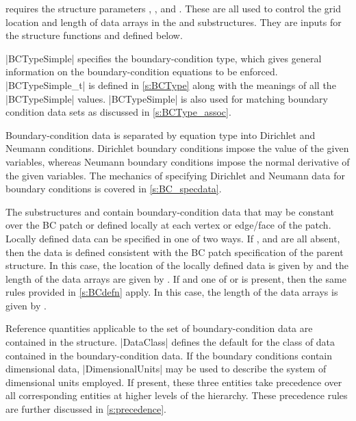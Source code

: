  requires the structure parameters ,
,  and
.  These are all used to control the grid location
and length of data arrays in the  and 
substructures.  They are inputs for the structure functions 
and  defined below.

|BCTypeSimple| specifies the boundary-condition type, which gives general
information on the bound\-ary-con\-di\-tion equations to be enforced.
|BCTypeSimple_t| is defined in \autoref{s:BCType} along with the meanings
of all the |BCTypeSimple| values.  
|BCTypeSimple| is also used for matching boundary condition data sets as 
discussed in \autoref{s:BCType_assoc}.

Boundary-condition data is separated by equation type into Dirichlet
and Neumann conditions.  Dirichlet boundary conditions impose the
value of the given variables, whereas Neumann boundary conditions
impose the normal derivative of the given variables.  The mechanics of
specifying Dirichlet and Neumann data for boundary conditions is covered
in \autoref{s:BC_specdata}.

The substructures  and  contain
boundary-condition data that may be constant over the BC patch or
defined locally at each vertex or edge/face of the patch.
Locally defined data can be specified in one of two ways.
If ,  and  are all absent,
then the data is defined consistent with the BC patch specification of the
parent  structure.  In this case, the location of the locally defined
data is given by  and the length of the data arrays
are given by .  If  and one of
 or  is present, then the same rules provided
in \autoref{s:BCdefn} apply.  In this case, the length of the data arrays
is given by .

Reference quantities applicable to the set of boundary-condition data are
contained in the  structure.
|DataClass| defines the default for the class of data contained in the
boundary-condition data.
If the boundary conditions contain dimensional data, |DimensionalUnits|
may be used to describe the system of dimensional units employed.
If present, these three entities take precedence over all corresponding
entities at higher levels of the hierarchy.
These precedence rules are further discussed in \autoref{s:precedence}.

